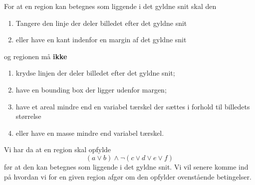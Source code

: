{For at en region kan betegnes som liggende i det gyldne snit skal den
\begin{enumerate}
	\renewcommand{\labelenumi}{(\alph{enumi})}
	\item Tangere den linje der deler billedet efter det gyldne snit
	\item eller have en kant indenfor en margin af det gyldne snit
\end{enumerate}
og regionen må \textbf{ikke}
\begin{enumerate}
	\renewcommand{\labelenumi}{(\alph{enumi})}
	\setcounter{enumi}{2}
	\item krydse linjen der deler billedet efter det gyldne snit;
	\item have en bounding box der ligger udenfor margen;
	\item have et areal mindre end en variabel tærskel der sættes i
		forhold til billedets størrelse
	\item eller have en masse mindre end variabel tærskel.
\end{enumerate}
Vi har da at en region skal opfylde
\begin{equation}
	(a \vee b) \wedge \neg (c \vee d \vee e \vee f)
\end{equation}
før at den kan betegnes som liggende i det gyldne snit. Vi vil senere
komme ind på hvordan vi for en given region afgør om den opfylder
ovenstående betingelser.

}

